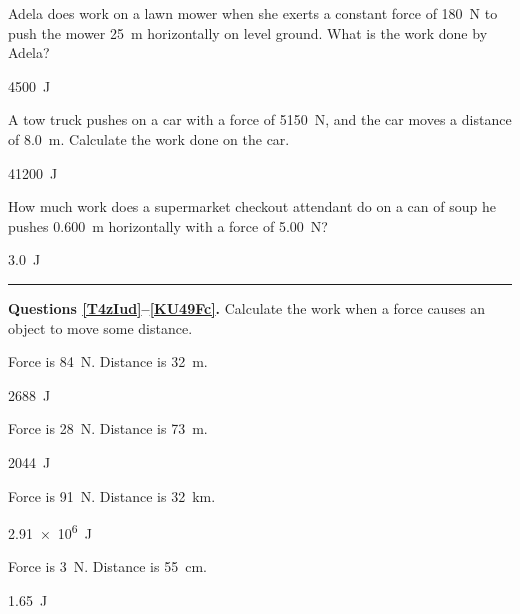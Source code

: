 \documentclass[]{exam}
\begin{document}
\begin{questions}
\question \label{Xh4gxC}
Adela does work on a lawn mower when she exerts a constant force of \SI{180}{N} to push the mower \SI{25}{m} horizontally on level ground. What is the work done by Adela?

\begin{solution}
\SI{4500}{J}
\end{solution}

\question \label{ZGiBxy}
A tow truck pushes on a car with a force of \SI{5150}{N}, and the car moves a distance of \SI{8.0}{m}. Calculate the work done on the car.

\begin{solution}
\SI{41200}{J}
\end{solution}

\question \label{MTcEJo}
How much work does a supermarket checkout attendant do on a can of soup he pushes \SI{0.600}{m} horizontally with a force of \SI{5.00}{N}?

\begin{solution}
\SI{3.0}{J}
\end{solution}

\bigskip

\hrule

\begin{EnvUplevel}
    \textbf{Questions \ref{T4zIud}--\ref{KU49Fc}.} Calculate the work when a force causes an object to move some distance.
\end{EnvUplevel}


\question \label{T4zIud}
Force is \SI{84}{N}. Distance is \SI{32}{m}.

\begin{solution}
\SI{2688}{J}
\end{solution}

\question \label{mroTSQ}
Force is \SI{28}{N}. Distance is \SI{73}{m}.

\begin{solution}
\SI{2044}{J}
\end{solution}


\question \label{1KDZL2}
Force is \SI{91}{N}. Distance is \SI{32}{km}.

\begin{solution}
\SI{2.91e6}{J}
\end{solution}


\question \label{masH3z}
Force is \SI{3}{N}. Distance is \SI{55}{cm}.

\begin{solution}
\SI{1.65}{J}
\end{solution}



\end{questions}
\end{document}
